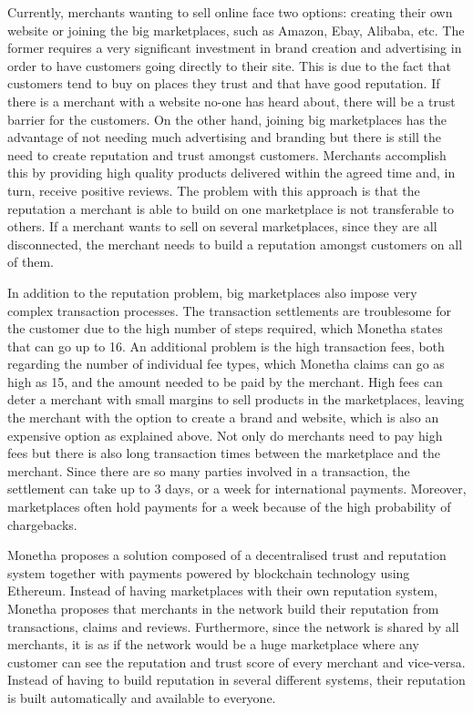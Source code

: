 Currently, merchants wanting to sell online face two options: creating their own website or joining the big marketplaces, such as Amazon, Ebay, Alibaba, etc. The former requires a very significant investment in brand creation and advertising in order to have customers going directly to their site. This is due to the fact that customers tend to buy on places they trust and that have good reputation. If there is a merchant with a website no-one has heard about, there will be a trust barrier for the customers. On the other hand, joining big marketplaces has the advantage of not needing much advertising and branding but there is still the need to create reputation and trust amongst customers. Merchants accomplish this by providing high quality products delivered within the agreed time and, in turn, receive positive reviews. The problem with this approach is that the reputation a merchant is able to build on one marketplace is not transferable to others. If a merchant wants to sell on several marketplaces, since they are all disconnected, the merchant needs to build a reputation amongst customers on all of them.

\medskip

In addition to the reputation problem, big marketplaces also impose very complex transaction processes. The transaction settlements are troublesome for the customer due to the high number of steps required, which Monetha states that can go up to 16. An additional problem is the high transaction fees, both regarding the number of individual fee types, which Monetha claims can go as high as 15, and the amount needed to be paid by the merchant. High fees can deter a merchant with small margins to sell products in the marketplaces, leaving the merchant with the option to create a brand and website, which is also an expensive option as explained above. Not only do merchants need to pay high fees but there is also long transaction times between the marketplace and the merchant. Since there are so many parties involved in a transaction, the settlement can take up to 3 days, or a week for international payments. Moreover, marketplaces often hold payments for a week because of the high probability of chargebacks.

\medskip

Monetha proposes a solution composed of a decentralised trust and reputation system together with payments powered by blockchain technology using Ethereum. Instead of having marketplaces with their own reputation system, Monetha proposes that merchants in the network build their reputation from transactions, claims and reviews. Furthermore, since the network is shared by all merchants, it is as if the network would be a huge marketplace where any customer can see the reputation and trust score of every merchant and vice-versa. Instead of having to build reputation in several different systems, their reputation is built automatically and available to everyone.

